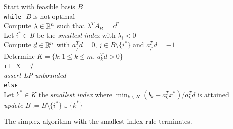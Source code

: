 \begin{algorithm}
 \begin{tabbing}
      Start with feasible basis $B$ \\[1ex]
      {\tt while} \= $B$ is not optimal \\ [.7ex]
      \> Compute $\lambda \in \mathbb{R}^n$ such that $\lambda^TA_B = c^T$ \\
      \> Let $i^* \in B$ be the \emph{ smallest index} with $\lambda_i<0$ \\
      \> Compute  $d \in \mathbb{R}^n$ with $a_j^T d = 0, \, j \in B \setminus\{i^*\}$
      and $a_{i^*}^T d = -1$ \\ 
      \> Determine $K = \{ k \colon 1 \leq k \leq m, \, a_k^Td >0\}$\\[.7ex]  
      \> {\tt if} \= $K = \emptyset$ \\   
      \> \> \emph{assert LP unbounded} \\
      \> {\tt else} \\
      \> \> Let $k^* \in K$ the \emph{smallest index} where 
     $
        \displaystyle \min_{k \in K} (b_k - a_k^Tx^*)/a_k^Td
      $
      is attained \\

      \> \>\emph{update} $B := B \setminus\{i^*\} \cup \{k^*\}$             
    \end{tabbing}
    
  \end{algorithm}
  



  \begin{theorem}
    \label{thr:3}
    The simplex algorithm with the smallest index rule terminates. 
  \end{theorem}

